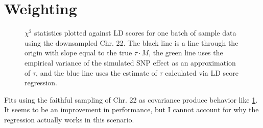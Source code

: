 \documentclass[12pt]{article}
\begin{document}
\section{Weighting}

\begin{figure}
\centering
{}
\hspace{0in}
\caption{$\chi^2$ statistics plotted against LD scores for one batch of sample data using the downsampled Chr. 22. The black line is a line through the origin with slope equal to the true $\tau \cdot M$, the green line uses the empirical variance of the simulated SNP effect as an approximation of $\tau$, and the blue line uses the estimate of $\tau$ calculated via LD score regression.}
\label{oddreg}
\end{figure}

Fits using the faithful sampling of Chr. 22 as covariance produce behavior like \ref{oddreg}. It seems to be an improvement in performance, but I cannot account for why the regression actually works in this scenario.
\end{document}
